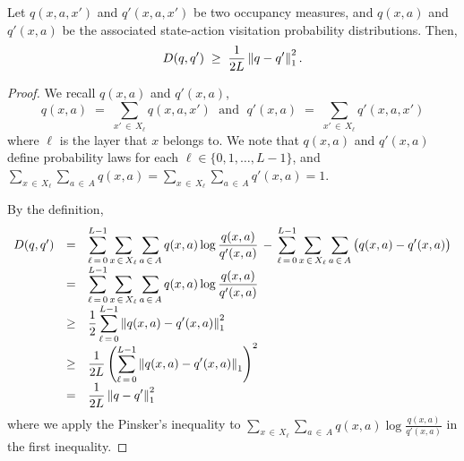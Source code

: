 \documentclass[12pt, final]{l4dc2023}
\begin{document}
\begin{lemma}\label{lem.D_lb}
	Let $q(x,a,x')$ and $q'(x,a,x')$ be two occupancy measures, and $q(x,a)$ and $q'(x,a)$ be the associated state-action visitation probability distributions. Then,
	\[
	D(q, q') \;\geq\;\frac{1}{2L} \left\|{q-q'}\right\|_1^2.
	\]
\end{lemma}
\begin{proof}
	We recall  $q(x,a)$ and $q'(x,a)$,
	\[
	q(x,a)\;=\;\sum_{x'\,\in\,X_\ell} q(x,a,x')
	\;\text{ and }\;
	q'(x,a)\;=\;\sum_{x'\,\in\,X_\ell} q'(x,a,x')
	\]
	where $\ell$ is the layer that $x$ belongs to. We note that $q(x,a)$ and $q'(x,a)$ define probability laws for each $\ell\in\{ 0,1,\ldots,L-1 \}$, and  $\sum_{x\,\in\,X_\ell}\sum_{a\,\in\,A}q(x,a) =  \sum_{x\,\in\,X_\ell}\sum_{a\,\in\,A}q'(x,a) = 1$.
	
	By the definition,
	\[
	\begin{array}{rcl}
	D(q, q') 
	& = & 
	\displaystyle
	\sum_{\ell\,=\,0}^{L-1} \sum_{x\,\in\,X_\ell} \sum_{a\,\in\,A} q(x,a) \log\frac{q(x,a)}{q'(x,a)}
	\,-\,
	\sum_{\ell\,=\,0}^{L-1} \sum_{x\,\in\,X_\ell} \sum_{a\,\in\,A}  \big(q(x,a)-q'(x,a)\big)
	\\[0.2cm]
	& = & 
	\displaystyle
	\sum_{\ell\,=\,0}^{L-1} \sum_{x\,\in\,X_\ell} \sum_{a\,\in\,A} q(x,a) \log\frac{q(x,a)}{q'(x,a)}
	\\[0.2cm]
	& \geq & 
	\displaystyle\frac{1}{2}
	\sum_{\ell\,=\,0}^{L-1} \left\|{ q(x,a)-q'(x,a)}\right\|_1^2
	\\[0.2cm]
	& \geq & 
	\displaystyle\frac{1}{2L}
	\left( \sum_{\ell\,=\,0}^{L-1} \left\|{ q(x,a)-q'(x,a)}\right\|_1\right)^2
	\\[0.2cm]
	& = & 
	\displaystyle\frac{1}{2L} \left\|{ q-q'}\right\|_1^2
	\end{array}
	\]
	where we apply the Pinsker's inequality to $\sum_{x\,\in\,X_\ell} \sum_{a\,\in\,A} q(x,a) \log\frac{q(x,a)}{q'(x,a)}$ in the first inequality.
	
\end{proof}
\end{document}
